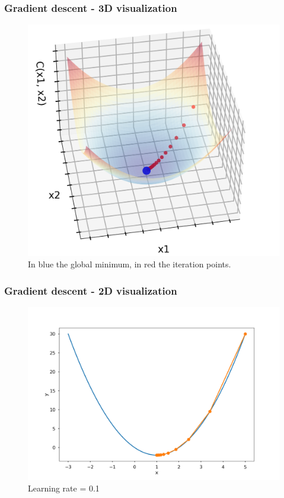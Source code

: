 \documentclass{beamer}
\begin{document}
	\begin{frame}
		\frametitle{Gradient descent - 3D visualization}
		\begin{figure}
			\centering
			\includegraphics[scale=0.4]{images/gradient_descent_3D}
			\caption{In blue the global minimum, in red the iteration points.}
		\end{figure}
	\end{frame}

	\begin{frame}
		\frametitle{Gradient descent - 2D visualization}
		\begin{figure}
			\centering
			\includegraphics[scale=0.3]{images/gradient_descent_1}
			\caption{Learning rate = 0.1}
		\end{figure}
	\end{frame}
\end{document}
